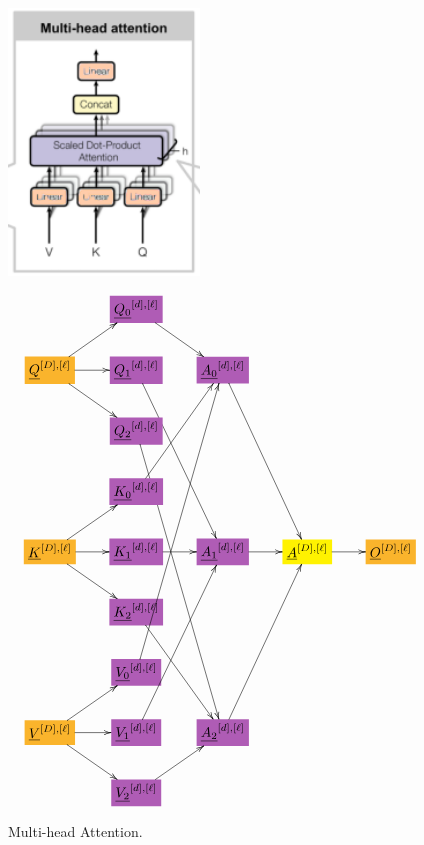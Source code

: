 \documentclass[12pt]{article}
\begin{document}
\begin{figure}[h!]\centering
\begin{minipage}{.5\linewidth}
\includegraphics[width=2in]{multi-head-att.png}
\end{minipage}%
\begin{minipage}{.5\linewidth}
$$\xymatrix{
&*+[F*:Orchid]{\underline{Q_0}^{[d],[\ell]}}\ar[dr]&&&
\\
*+[F*:Dandelion]{\underline{Q}^{[D], [\ell]}}\ar[ur]\ar[r]\ar[dr]&*+[F*:Orchid]{\underline{Q_1}^{[d],[\ell]}}\ar[dddr]&*+[F*:Orchid]{\underline{A_0}^{[d],[\ell]}}\ar[dddr]&&
\\
&*+[F*:Orchid]{\underline{Q_2}^{[d],[\ell]}}\ar[dddddr]&&&
\\
&*+[F*:Orchid]{\underline{K_0}^{[d],[\ell]}}\ar[uur]&&&
\\
*+[F*:Dandelion]{\underline{K}^{[D], [\ell]}}\ar[ur]\ar[r]\ar[dr]&*+[F*:Orchid]{\underline{K_1}^{[d],[\ell]}}\ar[r]&*+[F*:Orchid]{\underline{A_1}^{[d],[\ell]}}\ar[r]&*+[F*:yellow]{\underline{A}^{[D],[\ell]}}\ar[r]&*+[F*:Dandelion]{\underline{O}^{[D],[\ell]}}
\\
&*+[F*:Orchid]{\underline{K_2}^{[d],[\ell]}}\ar[ddr]&&&
\\
&*+[F*:Orchid]{\underline{V_0}^{[d],[\ell]}}\ar[uuuuur]&&&
\\
*+[F*:Dandelion]{\underline{V}^{[D], [\ell]}}\ar[ur]\ar[r]\ar[dr]&*+[F*:Orchid]{\underline{V_1}^{[d],[\ell]}}\ar[uuur]&*+[F*:Orchid]{\underline{A_2}^{[d],[\ell]}}\ar[uuur]&&
\\
&*+[F*:Orchid]{\underline{V_2}^{[d],[\ell]}}\ar[ur]&&&
}$$
\end{minipage}
\caption{Multi-head Attention.}
\label{fig-texnn-for-multi-head-att}
\end{figure}
\end{document}
